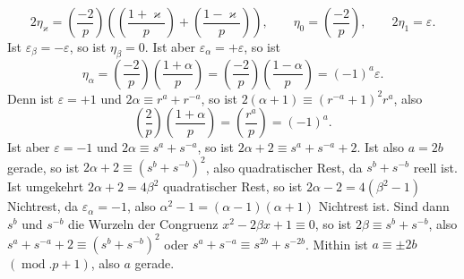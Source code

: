 \documentclass[11pt]{article}
\begin{document}
\begin{equation*}\tag{6.}
2\eta_\varkappa=
\left(\frac{-2}{p}\right)
\left(\left(\frac{1+\varkappa}{p}\right)+\left(\frac{1-\varkappa}{p}\right)\right),
\qquad
\eta_0=\left(\frac{-2}{p}\right),\qquad
2\eta_1=\varepsilon.
\end{equation*}
Ist $\varepsilon_\beta=-\varepsilon$, so ist $\eta_\beta=0$. Ist aber $\varepsilon_\alpha=+\varepsilon$, so ist
\begin{equation*}\tag{7.}
\eta_\alpha=
\left(\frac{-2}{p}\right)\left(\frac{1+\alpha}{p}\right)
=
\left(\frac{-2}{p}\right)\left(\frac{1-\alpha}{p}\right)
=(-1)^a\varepsilon.
\end{equation*}
Denn ist $\varepsilon=+1$ und $2\alpha\equiv r^a+r^{-a}$, so ist $2(\alpha+1)\equiv(r^{-a}+1)^2r^a$, also
\[
\left(\frac{2}{p}\right)\left(\frac{1+\alpha}{p}\right)=\left(\frac{r^a}{p}\right)=(-1)^a.
\]
Ist aber $\varepsilon=-1$ und $2\alpha\equiv s^a+s^{-a}$, so ist $2\alpha+2\equiv s^a+s^{-a}+2$. Ist also $a=2b$ gerade, so ist $2\alpha+2\equiv(s^b+s^{-b})^2$, also quadratischer Rest, da $s^b+s^{-b}$ reell ist. Ist umgekehrt $2\alpha+2=4\beta^2$ quadratischer Rest, so ist $2\alpha-2=4(\beta^2-1)$ Nichtrest, da $\varepsilon_\alpha=-1$, also $\alpha^2-1=(\alpha-1)(\alpha+1)$ Nichtrest ist. Sind dann $s^b$ und $s^{-b}$ die Wurzeln der Congruenz $x^2-2\beta x+1\equiv0$, so ist $2\beta\equiv s^b+s^{-b}$, also $s^a+s^{-a}+2\equiv(s^b+s^{-b})^2$ oder $s^a+s^{-a}\equiv s^{2b}+s^{-2b}$. Mithin ist $a\equiv\pm2b$ $(\operatorname{mod}.p+1)$, also $a$ gerade.
\end{document}
